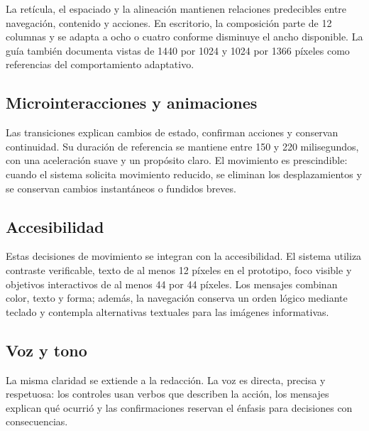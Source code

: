 La retícula, el espaciado y la alineación mantienen relaciones predecibles entre navegación,
contenido y acciones. En escritorio, la composición parte de 12 columnas y se adapta a ocho o
cuatro conforme disminuye el ancho disponible. La guía también documenta vistas de 1440 por
1024 y 1024 por 1366 píxeles como referencias del comportamiento adaptativo.


\subsection{Microinteracciones y animaciones}

Las transiciones explican cambios de estado, confirman acciones y conservan continuidad. Su
duración de referencia se mantiene entre 150 y 220 milisegundos, con una aceleración suave y
un propósito claro. El movimiento es prescindible: cuando el sistema solicita movimiento
reducido, se eliminan los desplazamientos y se conservan cambios instantáneos o fundidos
breves.

\subsection{Accesibilidad}

Estas decisiones de movimiento se integran con la accesibilidad. El sistema utiliza contraste
verificable, texto de al menos 12 píxeles en el prototipo, foco visible y objetivos
interactivos de al menos 44 por 44 píxeles. Los mensajes combinan color, texto y forma; además,
la navegación conserva un orden lógico mediante teclado y contempla alternativas textuales
para las imágenes informativas.

\subsection{Voz y tono}

La misma claridad se extiende a la redacción. La voz es directa, precisa y respetuosa: los
controles usan verbos que describen la acción, los mensajes explican qué ocurrió y las
confirmaciones reservan el énfasis para decisiones con consecuencias.


